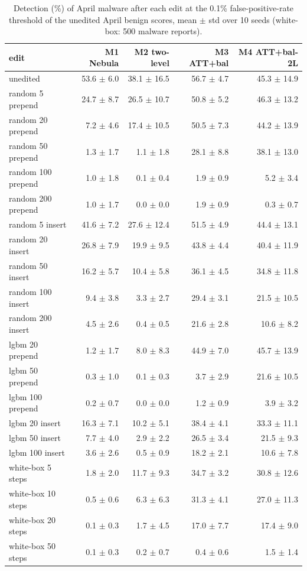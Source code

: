 \begin{table}[t]
\centering
\small
\caption{Detection (\%) of April malware after each edit at the 0.1\% false-positive-rate threshold of the unedited April benign scores, mean $\pm$ std over 10 seeds (white-box: 500 malware reports).}
\label{tab:T5b_attack_detection_0.1pct}
\begin{tabular}{lrrrr}
\toprule
edit & M1 Nebula & M2 two-level & M3 ATT+bal & M4 ATT+bal-2L \\
\midrule
unedited & 53.6 $\pm$ 6.0 & 38.1 $\pm$ 16.5 & 56.7 $\pm$ 4.7 & 45.3 $\pm$ 14.9 \\
random 5 prepend & 24.7 $\pm$ 8.7 & 26.5 $\pm$ 10.7 & 50.8 $\pm$ 5.2 & 46.3 $\pm$ 13.2 \\
random 20 prepend & 7.2 $\pm$ 4.6 & 17.4 $\pm$ 10.5 & 50.5 $\pm$ 7.3 & 44.2 $\pm$ 13.9 \\
random 50 prepend & 1.3 $\pm$ 1.7 & 1.1 $\pm$ 1.8 & 28.1 $\pm$ 8.8 & 38.1 $\pm$ 13.0 \\
random 100 prepend & 1.0 $\pm$ 1.8 & 0.1 $\pm$ 0.4 & 1.9 $\pm$ 0.9 & 5.2 $\pm$ 3.4 \\
random 200 prepend & 1.0 $\pm$ 1.7 & 0.0 $\pm$ 0.0 & 1.9 $\pm$ 0.9 & 0.3 $\pm$ 0.7 \\
random 5 insert & 41.6 $\pm$ 7.2 & 27.6 $\pm$ 12.4 & 51.5 $\pm$ 4.9 & 44.4 $\pm$ 13.1 \\
random 20 insert & 26.8 $\pm$ 7.9 & 19.9 $\pm$ 9.5 & 43.8 $\pm$ 4.4 & 40.4 $\pm$ 11.9 \\
random 50 insert & 16.2 $\pm$ 5.7 & 10.4 $\pm$ 5.8 & 36.1 $\pm$ 4.5 & 34.8 $\pm$ 11.8 \\
random 100 insert & 9.4 $\pm$ 3.8 & 3.3 $\pm$ 2.7 & 29.4 $\pm$ 3.1 & 21.5 $\pm$ 10.5 \\
random 200 insert & 4.5 $\pm$ 2.6 & 0.4 $\pm$ 0.5 & 21.6 $\pm$ 2.8 & 10.6 $\pm$ 8.2 \\
lgbm 20 prepend & 1.2 $\pm$ 1.7 & 8.0 $\pm$ 8.3 & 44.9 $\pm$ 7.0 & 45.7 $\pm$ 13.9 \\
lgbm 50 prepend & 0.3 $\pm$ 1.0 & 0.1 $\pm$ 0.3 & 3.7 $\pm$ 2.9 & 21.6 $\pm$ 10.5 \\
lgbm 100 prepend & 0.2 $\pm$ 0.7 & 0.0 $\pm$ 0.0 & 1.2 $\pm$ 0.9 & 3.9 $\pm$ 3.2 \\
lgbm 20 insert & 16.3 $\pm$ 7.1 & 10.2 $\pm$ 5.1 & 38.4 $\pm$ 4.1 & 33.3 $\pm$ 11.1 \\
lgbm 50 insert & 7.7 $\pm$ 4.0 & 2.9 $\pm$ 2.2 & 26.5 $\pm$ 3.4 & 21.5 $\pm$ 9.3 \\
lgbm 100 insert & 3.6 $\pm$ 2.6 & 0.5 $\pm$ 0.9 & 18.2 $\pm$ 2.1 & 10.6 $\pm$ 7.8 \\
white-box 5 steps & 1.8 $\pm$ 2.0 & 11.7 $\pm$ 9.3 & 34.7 $\pm$ 3.2 & 30.8 $\pm$ 12.6 \\
white-box 10 steps & 0.5 $\pm$ 0.6 & 6.3 $\pm$ 6.3 & 31.3 $\pm$ 4.1 & 27.0 $\pm$ 11.3 \\
white-box 20 steps & 0.1 $\pm$ 0.3 & 1.7 $\pm$ 4.5 & 17.0 $\pm$ 7.7 & 17.4 $\pm$ 9.0 \\
white-box 50 steps & 0.1 $\pm$ 0.3 & 0.2 $\pm$ 0.7 & 0.4 $\pm$ 0.6 & 1.5 $\pm$ 1.4 \\
\bottomrule
\end{tabular}
\end{table}

